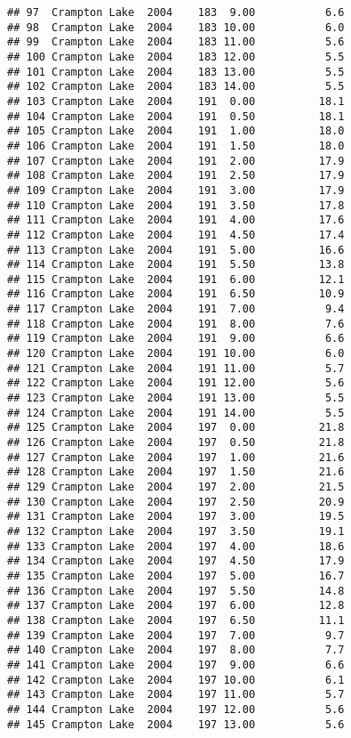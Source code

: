 \documentclass[
]{article}
\begin{document}
\begin{verbatim}
## 97  Crampton Lake  2004    183  9.00           6.6
## 98  Crampton Lake  2004    183 10.00           6.0
## 99  Crampton Lake  2004    183 11.00           5.6
## 100 Crampton Lake  2004    183 12.00           5.5
## 101 Crampton Lake  2004    183 13.00           5.5
## 102 Crampton Lake  2004    183 14.00           5.5
## 103 Crampton Lake  2004    191  0.00          18.1
## 104 Crampton Lake  2004    191  0.50          18.1
## 105 Crampton Lake  2004    191  1.00          18.0
## 106 Crampton Lake  2004    191  1.50          18.0
## 107 Crampton Lake  2004    191  2.00          17.9
## 108 Crampton Lake  2004    191  2.50          17.9
## 109 Crampton Lake  2004    191  3.00          17.9
## 110 Crampton Lake  2004    191  3.50          17.8
## 111 Crampton Lake  2004    191  4.00          17.6
## 112 Crampton Lake  2004    191  4.50          17.4
## 113 Crampton Lake  2004    191  5.00          16.6
## 114 Crampton Lake  2004    191  5.50          13.8
## 115 Crampton Lake  2004    191  6.00          12.1
## 116 Crampton Lake  2004    191  6.50          10.9
## 117 Crampton Lake  2004    191  7.00           9.4
## 118 Crampton Lake  2004    191  8.00           7.6
## 119 Crampton Lake  2004    191  9.00           6.6
## 120 Crampton Lake  2004    191 10.00           6.0
## 121 Crampton Lake  2004    191 11.00           5.7
## 122 Crampton Lake  2004    191 12.00           5.6
## 123 Crampton Lake  2004    191 13.00           5.5
## 124 Crampton Lake  2004    191 14.00           5.5
## 125 Crampton Lake  2004    197  0.00          21.8
## 126 Crampton Lake  2004    197  0.50          21.8
## 127 Crampton Lake  2004    197  1.00          21.6
## 128 Crampton Lake  2004    197  1.50          21.6
## 129 Crampton Lake  2004    197  2.00          21.5
## 130 Crampton Lake  2004    197  2.50          20.9
## 131 Crampton Lake  2004    197  3.00          19.5
## 132 Crampton Lake  2004    197  3.50          19.1
## 133 Crampton Lake  2004    197  4.00          18.6
## 134 Crampton Lake  2004    197  4.50          17.9
## 135 Crampton Lake  2004    197  5.00          16.7
## 136 Crampton Lake  2004    197  5.50          14.8
## 137 Crampton Lake  2004    197  6.00          12.8
## 138 Crampton Lake  2004    197  6.50          11.1
## 139 Crampton Lake  2004    197  7.00           9.7
## 140 Crampton Lake  2004    197  8.00           7.7
## 141 Crampton Lake  2004    197  9.00           6.6
## 142 Crampton Lake  2004    197 10.00           6.1
## 143 Crampton Lake  2004    197 11.00           5.7
## 144 Crampton Lake  2004    197 12.00           5.6
## 145 Crampton Lake  2004    197 13.00           5.6

\end{verbatim}
\end{document}
